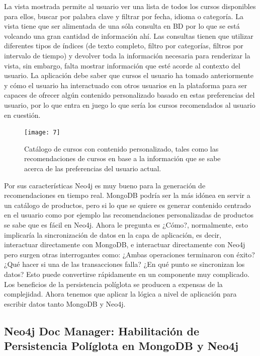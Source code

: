 \documentclass[conference]{IEEEtran}
\begin{document}
La vista mostrada permite al usuario ver una lista de todos los cursos disponibles para ellos, buscar por palabra clave y filtrar por fecha, idioma o categor\'ia. La vista tiene que ser alimentada de una s\'ola consulta en BD por lo que se est\'a volcando una gran cantidad de informaci\'on ah\'i. Las consultas tienen que utilizar diferentes tipos de \'indices (de texto completo, filtro por categor\'ias, filtros por intervalo de tiempo) y devolver toda la informaci\'on necesaria para renderizar la vista, sin embargo, falta mostrar informaci\'on que est\'e acorde al contexto del usuario. La aplicaci\'on debe saber que cursos el usuario ha tomado anteriormente y c\'omo el usuario ha interactuado con otros usuarios en la plataforma para ser capaces de ofrecer alg\'un contenido personalizado basado en estas preferencias del usuario, por lo que entra en juego lo que ser\'ia los cursos recomendados al usuario en cuesti\'on.

\begin{figure}[!h]
\centering
\texttt{[image: 7]}
\caption{Cat\'alogo de cursos con contenido personalizado, tales como las recomendaciones de cursos en base a la informaci\'on que se sabe acerca de las preferencias del usuario actual.}
\label{fig7}
\end{figure}

Por sus caracter\'isticas Neo4j es muy bueno para la generaci\'on de recomendaciones en tiempo real. MongoDB podr\'ia ser la m\'as id\'onea en servir a un cat\'alogo de productos, pero si lo que se quiere es generar contenido centrado en el usuario como por ejemplo las recomendaciones personalizadas de productos se sabe que es f\'acil en Neo4j. Ahora le pregunta es ¿C\'omo?, normalmente, esto implicar\'ia la sincronizaci\'on de datos en la capa de aplicaci\'on, es decir, interactuar directamente con  MongoDB, e interactuar directamente con Neo4j pero surgen otras interrogantes como: ¿Ambas operaciones terminaron con \'exito? ¿Qu\'e hacer si una de las transacciones falla? ¿En qu\'e punto se sincronizan los datos? Esto puede convertirse r\'apidamente en un componente muy complicado. Los beneficios de la persistencia pol\'iglota se producen a expensas de la complejidad. Ahora tenemos que aplicar la l\'ogica a nivel de aplicaci\'on para escribir datos tanto MongoDB y Neo4j.

\subsection*{Neo4j Doc Manager: Habilitaci\'on de Persistencia Pol\'iglota en MongoDB y Neo4j}
\end{document}
